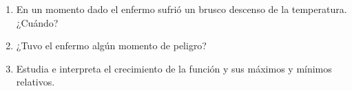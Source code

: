 \documentclass[fleqn]{article}
\begin{document}
\begin{enumerate}
\begin{enumerate}
\item En un momento dado el enfermo sufrió un brusco descenso de la temperatura. ¿Cuándo?\noanswer
\item ¿Tuvo el enfermo algún momento de peligro?\noanswer
\item Estudia e interpreta el crecimiento de la función y sus
máximos y mínimos relativos.\noanswer
\end{enumerate}


 \end{enumerate}
\end{document}
